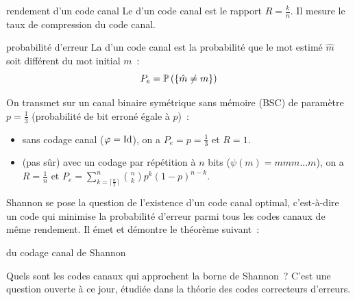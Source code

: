 \begin{definition}{}{rendement d'un code canal}
    Le  d'un code canal est le rapport $\displaystyle R = \frac{k}{n}$. Il mesure le taux de compression du code canal.
\end{definition}

\begin{definition}{}{probabilité d'erreur}
    La  d'un code canal est la probabilité que le mot estimé $\hat{m}$ soit différent du mot initial $m$~:
    $$P_e = \mathbb{P}\left(\left\{\hat{m} \neq m\right\}\right)$$
\end{definition}

\begin{exemple}{}{}
    On transmet sur un canal binaire symétrique sans mémoire (BSC) de paramètre $p=\frac{1}{3}$ (probabilité de bit erroné égale à $p$)~:
    \begin{itemize}
        \item sans codage canal ($\varphi = \mathrm{Id}$), on a $P_e = p = \frac{1}{3}$ et $R=1$.
        \item (pas sûr) avec un codage par répétition à $n$ bits ($\psi(m) = mmm...m$), on a $R = \frac{1}{n}$ et $P_e = \sum_{k=\lceil \frac{n}{2} \rceil}^{n} \binom{n}{k} p^k (1-p)^{n-k}$.
    \end{itemize}
\end{exemple}

Shannon se pose la question de l'existence d'un code canal optimal, c'est-à-dire un code qui minimise la probabilité d'erreur parmi tous les codes canaux de même rendement. Il émet et démontre le théorème suivant~:

\begin{theoreme}{}{du codage canal de Shannon}
    
\end{theoreme}

Quels sont les codes canaux qui approchent la borne de Shannon~? C'est une question ouverte à ce jour, étudiée dans la théorie des codes correcteurs d'erreurs.


